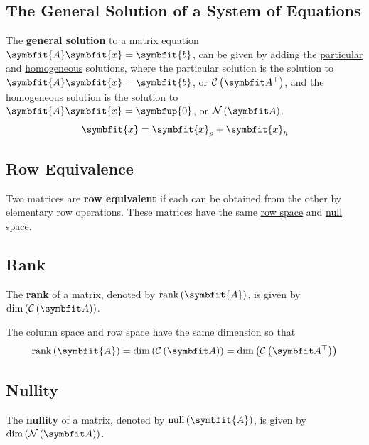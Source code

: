 \documentclass{article}
\begin{document}
	\subsection{The General Solution of a System of Equations}
	\begin{theorem}
		The \textbf{general solution} to a matrix equation $\symbfit{A}\symbfit{x}=\symbfit{b}$, can be given by adding the \underline{particular} and \underline{homogeneous} solutions, where the particular solution is the solution to $\symbfit{A}\symbfit{x}=\symbfit{b}$, or $\rowspace{A}$, and the homogeneous solution is the solution to $\symbfit{A}\symbfit{x}=\symbfup{0}$, or $\nullspace{A}$.
		\begin{equation*}
			\symbfit{x} = \symbfit{x}_p + \symbfit{x}_h
		\end{equation*}
	\end{theorem}
	\subsection{Row Equivalence}
	\begin{definition}
		Two matrices are \textbf{row equivalent} if each can be obtained from the other by elementary row operations. These matrices have the same \underline{row space} and \underline{null space}. 
	\end{definition}
	\subsection{Rank}
	\begin{definition}
		The \textbf{rank} of a matrix, denoted by $\rank{\left( \symbfit{A} \right)}$, is given by $\dim{\left( \columnspace{A} \right)}$.
	\end{definition}
	\begin{theorem}
		The column space and row space have the same dimension so that 
		\begin{equation*}
			\rank{\left( \symbfit{A} \right)}=\dim{\left( \columnspace{A} \right)}=\dim{\left( \rowspace{A} \right)}
		\end{equation*}
	\end{theorem}
	\subsection{Nullity}
	\begin{definition}
		The \textbf{nullity} of a matrix, denoted by $\vnull{\left( \symbfit{A} \right)}$, is given by $\dim{\left( \nullspace{A} \right)}$.
	\end{definition}
	\newpage
\end{document}
